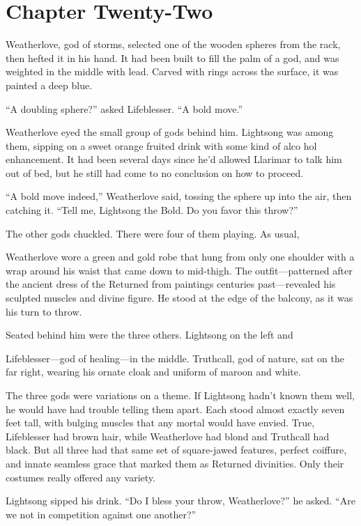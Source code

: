 \section{Chapter Twenty-Two}

Weatherlove, god of storms, selected one of the wooden spheres from the rack, then hefted it in his hand. It had been built to fill the palm of a god, and was weighted in the middle with lead. Carved with rings across the surface, it was painted a deep blue.

“A doubling sphere?” asked Lifeblesser. “A bold move.”

Weatherlove eyed the small group of gods behind him. Lightsong was among them, sipping on a sweet orange fruited drink with some kind of alco hol enhancement. It had been several days since he’d allowed Llarimar to talk him out of bed, but he still had come to no conclusion on how to proceed.

“A bold move indeed,” Weatherlove said, tossing the sphere up into the air, then catching it. “Tell me, Lightsong the Bold. Do you favor this throw?”

The other gods chuckled. There were four of them playing. As usual,

Weatherlove wore a green and gold robe that hung from only one shoulder with a wrap around his waist that came down to mid-thigh. The outfit—patterned after the ancient dress of the Returned from paintings centuries past—revealed his sculpted muscles and divine figure. He stood at the edge of the balcony, as it was his turn to throw.

Seated behind him were the three others. Lightsong on the left and

Lifeblesser—god of healing—in the middle. Truthcall, god of nature, sat on the far right, wearing his ornate cloak and uniform of maroon and white.

The three gods were variations on a theme. If Lightsong hadn’t known them well, he would have had trouble telling them apart. Each stood almost exactly seven feet tall, with bulging muscles that any mortal would have envied. True, Lifeblesser had brown hair, while Weatherlove had blond and Truthcall had black. But all three had that same set of square-jawed features, perfect coiffure, and innate seamless grace that marked them as Returned divinities. Only their costumes really offered any variety.

Lightsong sipped his drink. “Do I bless your throw, Weatherlove?” he asked. “Are we not in competition against one another?”

